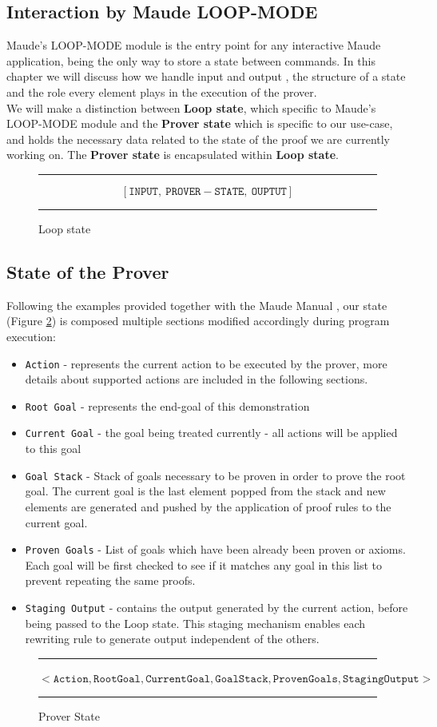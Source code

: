 \documentclass[12pt,a4paper]{article}
\begin{document}
{\subsection{Interaction by Maude LOOP-MODE}
Maude's LOOP-MODE module is the entry point for any interactive Maude application, being the only way to store a state between commands. In this chapter we will discuss how we handle input and output , the structure of a state and the role every element plays in the execution of the prover.\\

We will make a distinction between \textbf{Loop state}, which specific to Maude's LOOP-MODE module and the \textbf{Prover state} which is specific to our use-case, and holds the necessary data related to the state of the proof we are currently working on. The \textbf{Prover state} is encapsulated within \textbf{Loop state}.
\begin{figure}[h]
	\noindent\rule{\linewidth}{0.4pt}

	\[
		[\mathtt{INPUT},\ \mathtt{PROVER-STATE},\ \mathtt{OUPTUT}]
	\]
	\label{fig:loopState}
	\caption{Loop state}
	\noindent\rule{\linewidth}{0.4pt}
\end{figure}
\subsection{State of the Prover}
Following the examples provided together with the Maude Manual \cite{manual}, our state (Figure \ref{fig:ProverState}) is composed multiple sections modified accordingly during program execution:
\begin{itemize}
	\item{\texttt{Action} - represents the current action to be executed by the prover, more details about supported actions are included in the following sections.}
	\item{\texttt{Root Goal} - represents the end-goal of this demonstration}
	\item{\texttt{Current Goal} - the goal being treated currently - all actions will be applied to this goal}
	\item{\texttt{Goal Stack} - Stack of goals necessary to be proven in order to prove the root goal. The current goal is the last element popped from the stack and new elements are generated and pushed by the application of proof rules to the current goal.}
	\item{\texttt{Proven Goals} - List of goals which have been already been proven or axioms. Each goal will be first checked to see if it matches any goal in this list to prevent repeating the same proofs.}
	\item{\texttt{Staging Output} - contains the output generated by the current action, before being passed to the Loop state. This staging mechanism enables each rewriting rule to generate output independent of the others.}
\end{itemize}
\begin{figure}[h]
	\noindent\rule{\linewidth}{0.4pt}
	\(
	< \mathtt{Action}, \mathtt{Root Goal}, \mathtt{Current Goal}, \mathtt{Goal Stack}, \mathtt{Proven Goals}, \mathtt{Staging Output} >
	\)
	\caption{Prover State}
	\label{fig:ProverState}
	\noindent\rule{\linewidth}{0.4pt}
\end{figure}
}
\end{document}
